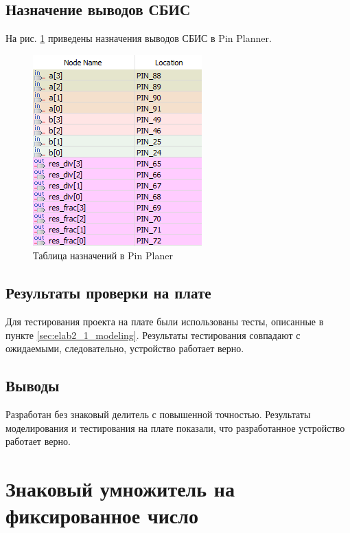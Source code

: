\subsection{Назначение выводов СБИС}

На рис. \ref{fig:elab2_1_pins} приведены назначения выводов СБИС в Pin Planner.

\begin{figure}[H]
\begin{center}
	\includegraphics{elab2_1_pins}
	\caption{Таблица назначений в Pin Planer}
	\label{fig:elab2_1_pins}
\end{center}
\end{figure}

\subsection{Результаты проверки на плате}

Для тестирования проекта на плате были использованы тесты, описанные в пункте \ref{sec:elab2_1_modeling}. Результаты тестирования совпадают с ожидаемыми, следовательно, устройство работает верно.

\subsection{Выводы}

Разработан без знаковый делитель с повышенной точностью. Результаты моделирования и тестирования на плате показали, что разработанное устройство работает верно.

\newpage

\section{Знаковый умножитель на фиксированное число}

